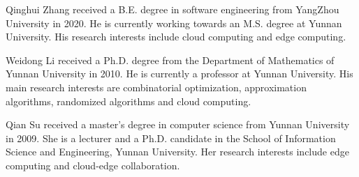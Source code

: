 \documentclass[journal]{IEEEtran}
\begin{document}
% 

\begin{IEEEbiography}{Qinghui Zhang}
	received a B.E. degree in software engineering from YangZhou University in 2020. He is currently working towards an M.S. degree at Yunnan University. His research interests include cloud computing and edge computing.
\end{IEEEbiography}



\begin{IEEEbiography}{Weidong Li}
	received a Ph.D. degree from the Department of Mathematics of Yunnan University in 2010. He is currently a professor at Yunnan University. His main research interests are combinatorial optimization, approximation algorithms, randomized algorithms and cloud computing.
\end{IEEEbiography}

\begin{IEEEbiography}{Qian Su}
	received a master's degree in computer
	science from Yunnan University in 2009. She is a lecturer and a Ph.D. candidate in the School
	of Information Science and Engineering, Yunnan University. Her research interests include edge
	computing and cloud-edge collaboration.
\end{IEEEbiography}
\end{document}
